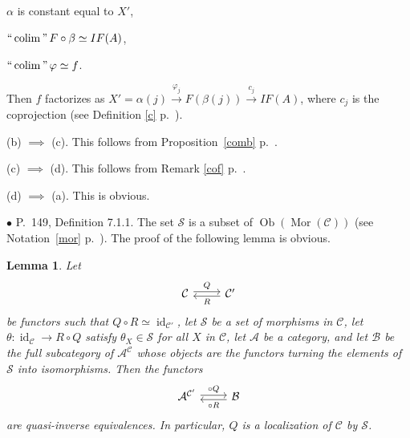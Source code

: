 \documentclass[12pt]{article}
\newtheorem{lem}[thm]{Lemma}
\theoremstyle{remark}%
\newcommand{\bu}{\bullet}
\newcommand{\n}{\noindent}
\newcommand{\cc}{\mathcal}
\newcommand{\A}{\mathcal A}
\newcommand{\B}{\mathcal B}
\newcommand{\C}{\mathcal C}
\newcommand{\p}{\varphi}
\newcommand{\xr}{\xrightarrow}
\newcommand{\pr}{Proposition}
\DeclareMathOperator*{\coli}{colim}
\DeclareMathOperator*{\ic}{``\coli"}
\DeclareMathOperator{\id}{id}
\DeclareMathOperator{\Mor}{Mor}
\DeclareMathOperator{\Ob}{Ob}
\begin{document}
$\alpha$ is constant equal to $X'$, 

$\ic F\circ\beta\simeq IF(A)$, 

$\ic\p\simeq f$. 

\n Then $f$ factorizes as $X'=\alpha(j)\xr{\p_j}F(\beta(j))\xr{c_j}IF(A)$, where $c_j$ is the coprojection (see Definition \ref{c} p.~\pageref{c}). 

\n(b) $\implies$ (c). This follows from \pr\ \ref{comb} p.~\pageref{comb}. 

\n(c) $\implies$ (d). This follows from Remark \ref{cof} p.~\pageref{cof}. 

\n(d) $\implies$ (a). This is obvious. 


\n$\bu$ P.~149, Definition 7.1.1. The set $\cc S$ is a subset of $\Ob(\Mor(\C))$ (see Notation~\ref{mor} p.~\pageref{mor}). The proof of the following lemma is obvious. 
%
\begin{lem}\label{711}
%
Let 
$$
\begin{tikzcd}\C\ar[yshift=.5ex]{r}{Q}&\C'\ar[yshift=-.4ex]{l}{R}\end{tikzcd}
$$ 
be functors such that $Q\circ R\simeq\id_{\C'}$, let $\cc S$ be a set of morphisms in $\C$, let $\theta:\id_\C\to R\circ Q$ satisfy $\theta_X\in\cc S$ for all $X$ in $\C$, let $\A$ be a category, and let $\B$ be the full subcategory of $\A^\C$ whose objects are the functors turning the elements of $\cc S$ into isomorphisms. Then the functors 
$$
\begin{tikzcd}\A^{\C'}\ar[yshift=.4ex]{r}{\circ Q}&\B\ar[yshift=-.5ex]{l}{\circ R}\end{tikzcd}
$$ 
are quasi-inverse equivalences. In particular, $Q$ is a localization of $\C$ by $\cc S$.
%
\end{lem}

\end{document}
